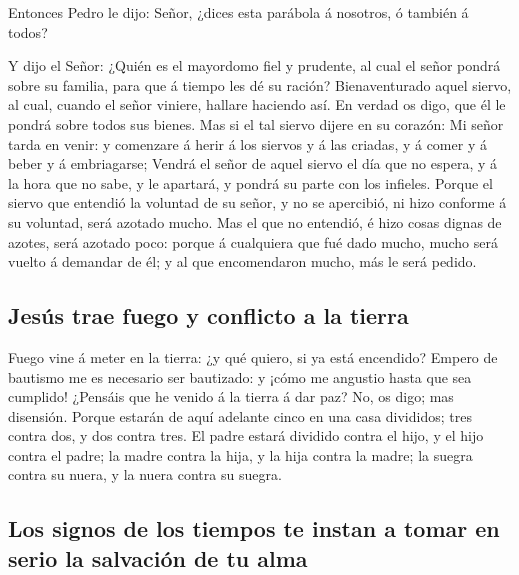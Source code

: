  Entonces Pedro le dijo: Señor, ¿dices esta parábola á
nosotros, ó también á todos?

 Y dijo el Señor: ¿Quién es el mayordomo fiel y prudente,
al cual el señor pondrá sobre su familia, para que á tiempo les dé su
ración?  Bienaventurado aquel siervo, al cual, cuando el
señor viniere, hallare haciendo así.  En verdad os digo,
que él le pondrá sobre todos sus bienes.  Mas si el tal
siervo dijere en su corazón: Mi señor tarda en venir: y comenzare á
herir á los siervos y á las criadas, y á comer y á beber y á
embriagarse;  Vendrá el señor de aquel siervo el día que
no espera, y á la hora que no sabe, y le apartará, y pondrá su parte con
los infieles.  Porque el siervo que entendió la voluntad
de su señor, y no se apercibió, ni hizo conforme á su voluntad, será
azotado mucho.  Mas el que no entendió, é hizo cosas
dignas de azotes, será azotado poco: porque á cualquiera que fué dado
mucho, mucho será vuelto á demandar de él; y al que encomendaron mucho,
más le será pedido.

\hypertarget{jesuxfas-trae-fuego-y-conflicto-a-la-tierra}{%
\subsection{Jesús trae fuego y conflicto a la
tierra}\label{jesuxfas-trae-fuego-y-conflicto-a-la-tierra}}

 Fuego vine á meter en la tierra: ¿y qué quiero, si ya
está encendido?  Empero de bautismo me es necesario ser
bautizado: y ¡cómo me angustio hasta que sea cumplido! 
¿Pensáis que he venido á la tierra á dar paz? No, os digo; mas
disensión.  Porque estarán de aquí adelante cinco en una
casa divididos; tres contra dos, y dos contra tres.  El
padre estará dividido contra el hijo, y el hijo contra el padre; la
madre contra la hija, y la hija contra la madre; la suegra contra su
nuera, y la nuera contra su suegra.

\hypertarget{los-signos-de-los-tiempos-te-instan-a-tomar-en-serio-la-salvaciuxf3n-de-tu-alma}{%
\subsection{Los signos de los tiempos te instan a tomar en serio la
salvación de tu
alma}\label{los-signos-de-los-tiempos-te-instan-a-tomar-en-serio-la-salvaciuxf3n-de-tu-alma}}

